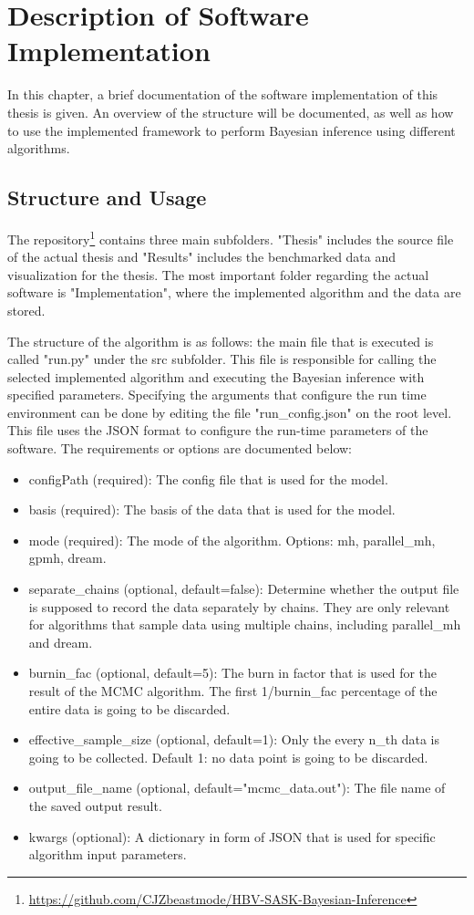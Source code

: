 \chapter{Description of Software Implementation}
In this chapter, a brief documentation of the software implementation of this thesis is given. An overview of the structure will be documented, as well as how to use the implemented framework to perform Bayesian inference using different algorithms.

\section{Structure and Usage}
The repository\footnote{\url{https://github.com/CJZbeastmode/HBV-SASK-Bayesian-Inference}} contains three main subfolders. "Thesis" includes the source file of the actual thesis and "Results" includes the benchmarked data and visualization for the thesis. The most important folder regarding the actual software is "Implementation", where the implemented algorithm and the data are stored.

The structure of the algorithm is as follows: the main file that is executed is called "run.py" under the src subfolder. This file is responsible for calling the selected implemented algorithm and executing the Bayesian inference with specified parameters. Specifying the arguments that configure the run time environment can be done by editing the file "run\_config.json" on the root level. This file uses the JSON format to configure the run-time parameters of the software. The requirements or options are documented below:

\begin{itemize}
    \item configPath (required): The config file that is used for the model.
    \item basis (required): The basis of the data that is used for the model.
    \item mode (required): The mode of the algorithm. Options: mh, parallel\_mh, gpmh, dream.
    \item separate\_chains (optional, default=false): Determine whether the output file is supposed to record the data separately by chains. They are only relevant for algorithms that sample data using multiple chains, including parallel\_mh and dream.
    \item burnin\_fac (optional, default=5): The burn in factor that is used for the result of the MCMC algorithm. The first 1/burnin\_fac percentage of the entire data is going to be discarded.
    \item effective\_sample\_size (optional, default=1): Only the every n\_th data is going to be collected. Default 1: no data point is going to be discarded.
    \item output\_file\_name (optional, default="mcmc\_data.out"): The file name of the saved output result.
    \item kwargs (optional): A dictionary in form of JSON that is used for specific algorithm input parameters.
\end{itemize}

